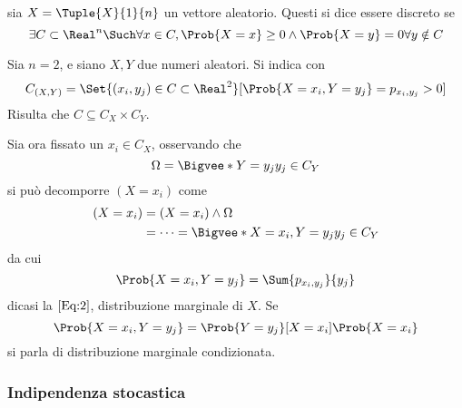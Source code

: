 \documentclass{subfiles}
\begin{document}
\begin{Definition*}
    sia $X = \Tuple{X}{1}{n}$ un vettore aleatorio.
    Questi si dice essere discreto se
    $$
        \exists C \subset \Real^{n} \Such \forall x \in C, \Prob{X = x} \ge 0 \land \Prob{X = y} = 0 \forall y \notin C
    $$\vspace{-10pt}
\end{Definition*}

Sia $n = 2$, e siano $X, Y$ due numeri aleatori. Si indica con
$$
    C_{(X, Y)} = \Set{(x_{i}, y_{j}) \in C \subset \Real^{2}}[\Prob{X = x_{i}, Y = y_{j}} = p_{x_{i}, y_{j}} > 0]
$$
Risulta che $C \subseteq C_{X} \times C_{Y}$.

Sia ora fissato un $x_{i} \in C_{X}$, osservando che
$$
    \Omega = \Bigvee*{Y = y_{j}}{y_{j} \in C_{Y}}
$$
si può decomporre $(X = x_{i})$ come
$$\begin{aligned}
        (X = x_{i}) & = (X = x_{i}) \land \Omega                                 \\
                    & = \cdots = \Bigvee*{X = x_{i}, Y = y_{j}}{y_{j} \in C_{Y}}
    \end{aligned}$$
da cui
\begin{equation}
    \Prob{X = x_{i}, Y = y_{j}} = \Sum{p_{x_{i}, y_{j}}}{y_{j}}
\end{equation}
dicasi la $\eqref{Eq:2}$, distribuzione marginale di $X$.
Se
$$
    \Prob{X = x_{i}, Y = y_{j}} = \Prob{Y = y_{j}}[X = x_{i}] \Prob{X = x_{i}}
$$
si parla di distribuzione marginale condizionata.

\subsubsection{Indipendenza stocastica}

\end{document}
